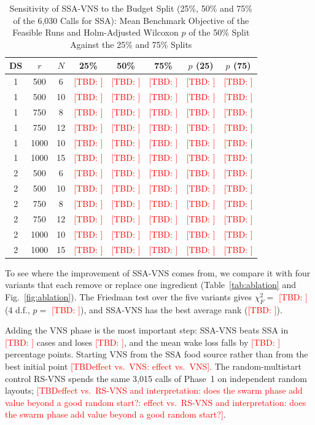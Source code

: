\documentclass[journal,twoside]{IEEEtran}
\newcommand{\TBD}[1]{\textcolor{red}{[TBD\ifx\relax#1\relax\else: #1\fi]}}
\begin{document}
\begin{table}[!t]
\centering
\caption{Sensitivity of SSA-VNS to the Budget Split (25\%, 50\% and 75\% of the 6,030 Calls for SSA): Mean Benchmark Objective of the Feasible Runs and Holm-Adjusted Wilcoxon $p$ of the 50\% Split Against the 25\% and 75\% Splits}
\label{tab:split}
\scriptsize\setlength{\tabcolsep}{2.5pt}
\begin{tabular}{cccccccc}
\toprule
DS & $r$ & $N$ & 25\% & 50\% & 75\% & $p$ (25) & $p$ (75) \\
\midrule
1 & 500 & 6 & \TBD{} & \TBD{} & \TBD{} & \TBD{} & \TBD{} \\
1 & 500 & 10 & \TBD{} & \TBD{} & \TBD{} & \TBD{} & \TBD{} \\
1 & 750 & 8 & \TBD{} & \TBD{} & \TBD{} & \TBD{} & \TBD{} \\
1 & 750 & 12 & \TBD{} & \TBD{} & \TBD{} & \TBD{} & \TBD{} \\
1 & 1000 & 10 & \TBD{} & \TBD{} & \TBD{} & \TBD{} & \TBD{} \\
1 & 1000 & 15 & \TBD{} & \TBD{} & \TBD{} & \TBD{} & \TBD{} \\
2 & 500 & 6 & \TBD{} & \TBD{} & \TBD{} & \TBD{} & \TBD{} \\
2 & 500 & 10 & \TBD{} & \TBD{} & \TBD{} & \TBD{} & \TBD{} \\
2 & 750 & 8 & \TBD{} & \TBD{} & \TBD{} & \TBD{} & \TBD{} \\
2 & 750 & 12 & \TBD{} & \TBD{} & \TBD{} & \TBD{} & \TBD{} \\
2 & 1000 & 10 & \TBD{} & \TBD{} & \TBD{} & \TBD{} & \TBD{} \\
2 & 1000 & 15 & \TBD{} & \TBD{} & \TBD{} & \TBD{} & \TBD{} \\
\bottomrule
\end{tabular}
\end{table}

To see where the improvement of SSA-VNS comes from, we compare it with four variants that each remove or replace one ingredient (Table~\ref{tab:ablation} and Fig.~\ref{fig:ablation}). The Friedman test over the five variants gives $\chi^2_F=$ \TBD{} (4 d.f., $p=$ \TBD{}), and SSA-VNS has the best average rank (\TBD{}).

Adding the VNS phase is the most important step: SSA-VNS beats SSA in \TBD{} cases and loses \TBD{}, and the mean wake loss falls by \TBD{} percentage points. Starting VNS from the SSA food source rather than from the best initial point \TBD{effect vs.\ VNS}. The random-multistart control RS-VNS spends the same 3,015 calls of Phase~1 on independent random layouts; \TBD{effect vs.\ RS-VNS and interpretation: does the swarm phase add value beyond a good random start?}.
\end{document}
